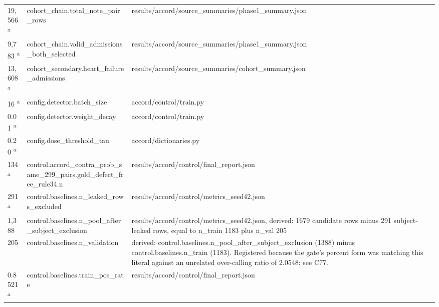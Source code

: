 \begin{longtable}{@{}p{0.7in}p{1.9in}p{2.6in}@{}}
19,566 \textsuperscript{a} & cohort\_chain.\allowbreak{}total\_note\_pair\_rows & results/\allowbreak{}accord/\allowbreak{}source\_summaries/\allowbreak{}phase1\_summary.\allowbreak{}json\\
9,783 \textsuperscript{a} & cohort\_chain.\allowbreak{}valid\_admissions\_both\_selected & results/\allowbreak{}accord/\allowbreak{}source\_summaries/\allowbreak{}phase1\_summary.\allowbreak{}json\\
13,608 \textsuperscript{a} & cohort\_secondary.\allowbreak{}heart\_failure\_admissions & results/\allowbreak{}accord/\allowbreak{}source\_summaries/\allowbreak{}cohort\_summary.\allowbreak{}json\\
16 \textsuperscript{a} & config.\allowbreak{}detector.\allowbreak{}batch\_size & accord/\allowbreak{}control/\allowbreak{}train.\allowbreak{}py\\
0.01 \textsuperscript{a} & config.\allowbreak{}detector.\allowbreak{}weight\_decay & accord/\allowbreak{}control/\allowbreak{}train.\allowbreak{}py\\
0.20 \textsuperscript{a} & config.\allowbreak{}dose\_threshold\_tau & accord/\allowbreak{}dictionaries.\allowbreak{}py\\
134 \textsuperscript{a} & control.\allowbreak{}accord\_contra\_prob\_same\_299\_pairs.\allowbreak{}gold\_defect\_free\_rule34.\allowbreak{}n & results/\allowbreak{}accord/\allowbreak{}control/\allowbreak{}final\_report.\allowbreak{}json\\
291 \textsuperscript{a} & control.\allowbreak{}baselines.\allowbreak{}n\_leaked\_rows\_excluded & results/\allowbreak{}accord/\allowbreak{}control/\allowbreak{}metrics\_seed42.\allowbreak{}json\\
1,388 & control.\allowbreak{}baselines.\allowbreak{}n\_pool\_after\_subject\_exclusion & results/\allowbreak{}accord/\allowbreak{}control/\allowbreak{}metrics\_seed42.\allowbreak{}json, derived: 1679 candidate rows minus 291 subject-leaked rows, equal to n\_train 1183 plus n\_val 205\\
205 & control.\allowbreak{}baselines.\allowbreak{}n\_validation & derived: control.\allowbreak{}baselines.\allowbreak{}n\_pool\_after\_subject\_exclusion (1388) minus control.\allowbreak{}baselines.\allowbreak{}n\_train (1183).\allowbreak{} Registered because the gate's percent form was matching this literal against an unrelated over-calling ratio of 2.\allowbreak{}0548; see C77.\allowbreak{}\\
0.8521 \textsuperscript{a} & control.\allowbreak{}baselines.\allowbreak{}train\_pos\_rate & results/\allowbreak{}accord/\allowbreak{}control/\allowbreak{}final\_report.\allowbreak{}json\\

\end{longtable}

